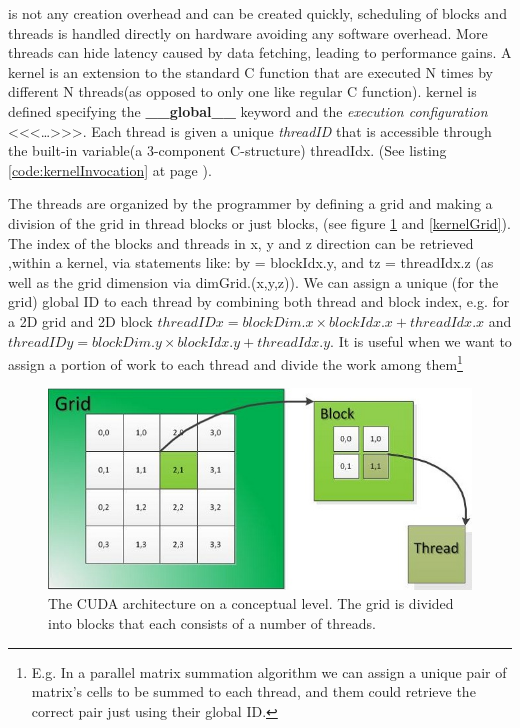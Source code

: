 is not any creation overhead and can be created quickly, scheduling of blocks
and threads is handled directly on hardware avoiding any software overhead. 
More threads can hide latency caused by data fetching, leading to performance gains.
A kernel is an extension to the standard C function that are executed N times
by different N threads(as opposed to only one like regular C function).
 kernel is defined specifying the \textbf{\color{green} \_\_global\_\_} keyword
and the \textit{execution configuration}
\textless\textless\textless \ldots \textgreater\textgreater\textgreater. Each
thread is given a unique \textit{threadID} that is accessible through the
built-in variable(a 3-component C-structure) threadIdx. (See listing
\ref{code:kernelInvocation} at page \pageref{code:kernelInvocation}).

The threads are organized by the programmer by defining a grid and making a division
of the grid in thread blocks or just blocks, (see figure \ref{threadHierarchy}
and \ref{kernelGrid}).
The index of the blocks and threads in x, y and z direction can be retrieved
,within a kernel, via statements like: by = blockIdx.y, and tz = threadIdx.z (as
well as the grid dimension via dimGrid.(x,y,z)).
We can assign a unique (for the grid) global ID to each thread by combining
both thread and block index, e.g. for a 2D grid and 2D block \(threadIDx = blockDim.x
\times blockIdx.x + threadIdx.x \) and \(threadIDy = blockDim.y \times blockIdx.y +
threadIdx.y\). It is useful when we want to assign a portion of work to each
thread and divide the work among them\footnote{E.g. In a parallel matrix
summation algorithm we can assign a unique pair of matrix's cells to be summed
to each thread, and them could retrieve the correct pair just using their global
ID.}
\begin{center}
\begin{figure}
\centering
\includegraphics[scale=0.8]{./images/thread_hierarchy1}
\caption{The CUDA architecture on a conceptual level. The grid is divided into blocks that each consists of a number
of threads.}
\label{threadHierarchy}
\end{figure}
\end{center}
\FloatBarrier

